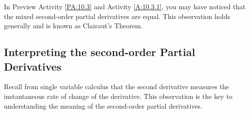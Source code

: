 In Preview Activity \ref{PA:10.3} and Activity \ref{A:10.3.1}, you may have noticed 
that the mixed second-order partial derivatives are equal.
This observation holds generally and is known as Clairaut's Theorem.

\vspace*{5pt}
\nin 
{}
\vspace*{5pt}


\subsection*{Interpreting the second-order Partial Derivatives}

Recall from single variable calculus that the second derivative
measures the instantaneous rate of change of the derivative.  This observation is
the key to understanding the meaning of the second-order partial
derivatives.  

